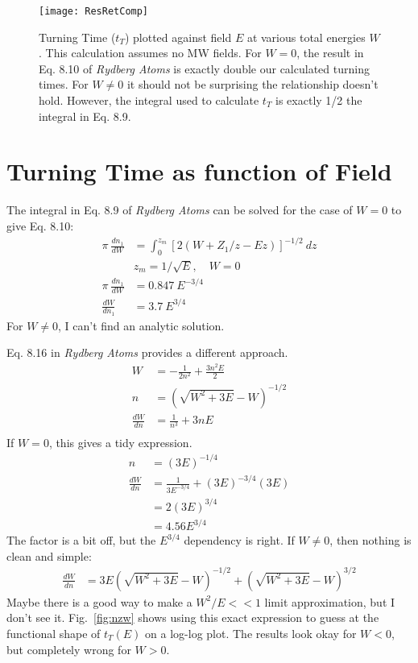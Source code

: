 \documentclass[aps,pra,preprint,groupedaddress]{revtex4-1}
\begin{document}
\begin{figure}
\texttt{[image: ResRetComp]}
\caption{\label{fig:RRC} Turning Time ($t_T$) plotted against field $E$ at various total energies $W$. This calculation assumes no MW fields. For $W=0$, the result in Eq. 8.10 of \emph{Rydberg Atoms} is exactly double our calculated turning times. For $W \neq 0$ it should not be surprising the relationship doesn't hold. However, the integral used to calculate $t_T$ is exactly 1/2 the integral in Eq. 8.9.}
\end{figure}

\section{\label{sec:fpower} Turning Time as function of Field}

The integral in Eq. 8.9 of \emph{Rydberg Atoms} can be solved for the case of $W = 0$ to give Eq. 8.10:
\begin{align*}
\pi ~ \frac{dn_1}{dW} & = \int_0^{z_m} [2(W + Z_1 / z - Ez)]^{-1/2} ~ dz \\
 & z_m = 1/\sqrt{E}, \quad W = 0 \\
\pi ~ \frac{dn_1}{dW} & = 0.847 ~ E^{-3/4} \\
\frac{dW}{dn_1} & = 3.7 ~ E^{3/4}
\end{align*}
For $W \neq 0$, I can't find an analytic solution.

Eq. 8.16 in \emph{Rydberg Atoms} provides a different approach.
\begin{align*}
W & = - \frac{1}{2n^2} + \frac{3n^2E}{2} \\
n & = \left( \sqrt{W^2 + 3E} - W \right)^{-1/2} \\
\frac{dW}{dn} & = \frac{1}{n^3} + 3nE \\
\end{align*}
If $W = 0$, this gives a tidy expression.
\begin{align*}
n & = (3E)^{-1/4} \\
\frac{dW}{dn} & = \frac{1}{3E^{-3/4}} + (3E)^{-3/4} (3E) \\
 & = 2(3E)^{3/4} \\
 & = 4.56 E^{3/4}
\end{align*}
The factor is a bit off, but the $E^{3/4}$ dependency is right. If $W \neq 0$, then nothing is clean and simple:
\begin{align*}
\frac{dW}{dn} & = 3E \left(\sqrt{W^2 + 3E} - W\right)^{-1/2} + \left(\sqrt{W^2 + 3E} - W\right)^{3/2}
\end{align*}
Maybe there is a good way to make a $W^2/E << 1$ limit approximation, but I don't see it. Fig.~\ref{fig:nzw} shows using this exact expression to guess at the functional shape of $t_T(E)$ on a log-log plot. The results look okay for $W<0$, but completely wrong for $W>0$.
\end{document}
